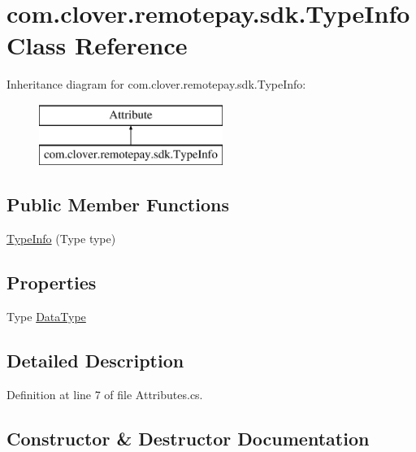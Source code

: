 \hypertarget{classcom_1_1clover_1_1remotepay_1_1sdk_1_1_type_info}{}\section{com.\+clover.\+remotepay.\+sdk.\+Type\+Info Class Reference}
\label{classcom_1_1clover_1_1remotepay_1_1sdk_1_1_type_info}
Inheritance diagram for com.\+clover.\+remotepay.\+sdk.\+Type\+Info\+:\begin{figure}[H]
\begin{center}
\leavevmode
\includegraphics[height=2.000000cm]{classcom_1_1clover_1_1remotepay_1_1sdk_1_1_type_info}
\end{center}
\end{figure}
\subsection*{Public Member Functions}
\begin{DoxyCompactItemize}
\item 
\hyperlink{classcom_1_1clover_1_1remotepay_1_1sdk_1_1_type_info_aa77e8f9d0e140c12469398f034ddfb46}{Type\+Info} (Type type)
\end{DoxyCompactItemize}
\subsection*{Properties}
\begin{DoxyCompactItemize}
\item 
Type \hyperlink{classcom_1_1clover_1_1remotepay_1_1sdk_1_1_type_info_a132ce2ff6112da78d014a434cc7d5097}{Data\+Type}
\end{DoxyCompactItemize}


\subsection{Detailed Description}


Definition at line 7 of file Attributes.\+cs.



\subsection{Constructor \& Destructor Documentation}
\mbox{\label{classcom_1_1clover_1_1remotepay_1_1sdk_1_1_type_info_aa77e8f9d0e140c12469398f034ddfb46}} 
